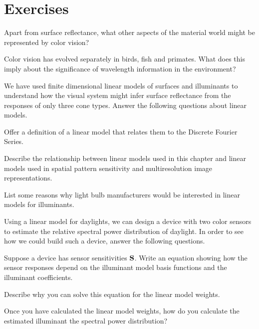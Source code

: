 %
%
\newpage
\section*{Exercises}

\be %

\item Apart from surface reflectance, what other aspects of the
material world might be represented by color vision?

\item Color vision has evolved separately in birds, fish and primates.  What
does this imply about the significance of wavelength information in the
environment?

\item We have used finite dimensional linear models of surfaces and
illuminants to understand how the visual system might infer surface
reflectance from the responses of only three cone types.
Answer the following questions about linear models.
 \be
 \item Offer a definition of a linear model that relates them to
the Discrete Fourier Series.

 \item Describe the relationship between linear models used in this
chapter and linear models used in spatial pattern sensitivity and
multiresolution image representations.

 \item List some reasons why light bulb manufacturers would be
interested in linear models for illuminants.

 \item Using a linear model for daylights, we can design a device
with two color sensors to estimate the relative spectral power
distribution of daylight.  In order to see how we could build such a
device, answer the following questions.

 \be
  \item Suppose a device has sensor sensitivities $\mbox{$\bf S$}$.
    Write an equation showing how the sensor responses depend on
    the illuminant model basis functions and the illuminant coefficients.
\comment{
\[
\recResp = \sensorMat^t \illBasis \illCoef
\]
}
 \item Describe why you can solve this equation for the linear model weights.

 \item Once you have calculated the linear model weights,
how do you calculate the estimated illuminant the spectral power distribution?

